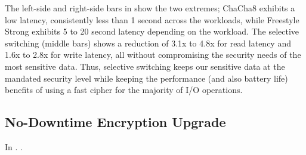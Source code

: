 

The left-side and right-side bars in  show the two
extremes; ChaCha8 exhibits a low latency, consistently less than 1 second across
the workloads, while Freestyle Strong exhibits 5 to 20 second latency depending
on the workload.  The selective switching (middle bars) shows a reduction of
3.1x to 4.8x for read latency and 1.6x to 2.8x for write latency, all without
compromising the security needs of the most sensitive data.  Thus, selective
switching keeps our sensitive data at the mandated security level while keeping
the performance (and also battery life) benefits of using a fast cipher for the
majority of I/O operations.


\subsection{No-Downtime Encryption Upgrade}\label{subsec:uc4}



In  . .
